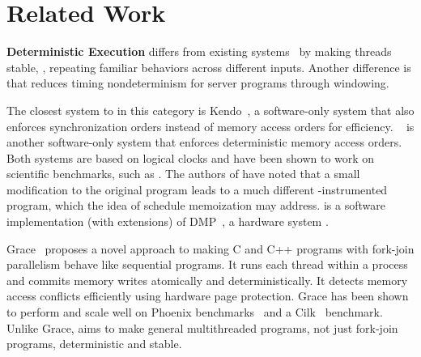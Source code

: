 \section{Related Work} \label{sec:tern-related}

\noindent
{\bf Deterministic Execution} \tern differs from existing \dmt
systems~\cite{dmp:asplos09,coredet:asplos10,kendo:asplos09} by making
threads stable, \ie, repeating familiar behaviors across different inputs.
Another difference is that \tern reduces timing nondeterminism for server
programs through windowing.


The closest system to \tern in this category is
Kendo~\cite{kendo:asplos09}, a software-only \dmt system that also
enforces synchronization orders instead of memory access orders for
efficiency.  \coredet~\cite{coredet:asplos10} is another software-only \dmt
system that enforces deterministic memory access orders.  Both systems are
based on logical clocks and have been shown to work on scientific
benchmarks, such as \splash.  The authors of \coredet have noted that a small
modification to the original program leads to a much different
\coredet-instrumented program, which the idea of schedule memoization may
address.  \coredet is a software implementation (with extensions) of
DMP~\cite{dmp:asplos09}, a hardware \dmt system .

Grace~\cite{grace:oopsla09} proposes a novel approach to making C and C++
programs with fork-join parallelism behave like sequential programs.  It
runs each thread within a process and commits memory writes atomically and
deterministically.  It detects memory access conflicts efficiently using
hardware page protection.  Grace has been shown to perform and scale well
on Phoenix benchmarks~\cite{phoenix-benchmarks} and a Cilk~\cite{cilk}
benchmark.  Unlike Grace, \tern aims to make general multithreaded
programs, not just fork-join programs, deterministic and stable.



